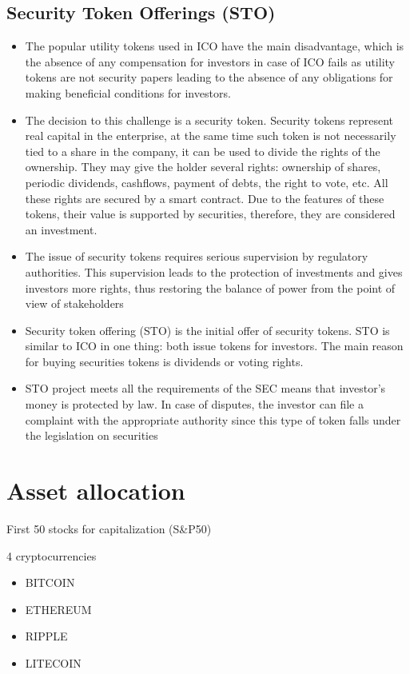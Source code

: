 \subsection{Security Token Offerings (STO)}
\begin{itemize}
	\item The popular utility tokens used in ICO have the main disadvantage, which is the absence of any compensation for investors in case of ICO fails as utility tokens are not security papers leading to the absence of any obligations for making beneficial conditions for investors. 
	\item The decision to this challenge is a security token. Security tokens represent real capital in the enterprise, at the same time such token is not necessarily tied to a share in the company, it can be used to divide the rights of the ownership. They may give the holder several rights: ownership of shares, periodic dividends, cashflows, payment of debts, the right to vote, etc. All these rights are secured by a smart contract. Due to the features of these tokens, their value is supported by securities, therefore, they are considered an investment. 
	\item The issue of security tokens requires serious supervision by regulatory authorities. This supervision leads to the protection of investments and gives investors more rights, thus restoring the balance of power from the point of view of stakeholders 
	\item Security token offering (STO) is the initial offer of security tokens. STO is similar to ICO in one thing: both issue tokens for investors. The main reason for buying securities tokens is dividends or voting rights.
	\item STO project meets all the requirements of the SEC means that investor's money is protected by law. In case of disputes, the investor can file a complaint with the appropriate authority since this type of token falls under the legislation on securities 
\end{itemize}


\section{Asset allocation}

First 50 stocks for capitalization (S\&P50)

4 cryptocurrencies
\begin{itemize}
	\item BITCOIN
	\item ETHEREUM
	\item RIPPLE
	\item LITECOIN
\end{itemize}

